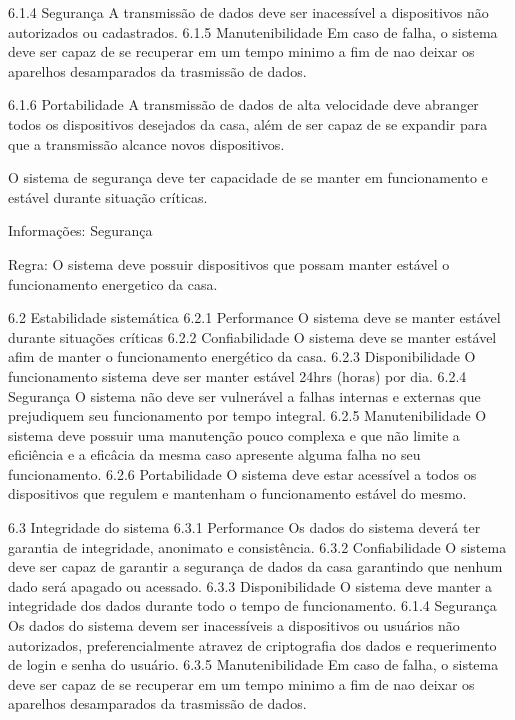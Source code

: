 6.1.4 Segurança
    A transmissão de dados deve ser inacessível a dispositivos não autorizados ou cadastrados.
6.1.5 Manutenibilidade
    Em caso de falha, o sistema deve ser capaz de se recuperar em um tempo minimo a fim de nao deixar os aparelhos desamparados da trasmissão de dados.

6.1.6 Portabilidade
    A transmissão de dados de alta velocidade deve abranger todos os dispositivos desejados da casa, além de ser capaz de se expandir para que a transmissão alcance novos dispositivos.






 O sistema de segurança deve ter capacidade de se manter em funcionamento e estável durante situação críticas.
    
    Informações: Segurança

    Regra: O sistema deve possuir dispositivos que possam manter estável o funcionamento energetico da casa.


6.2 Estabilidade sistemática
6.2.1 Performance 
O sistema deve se manter estável durante situações críticas
6.2.2 Confiabilidade
    O sistema deve se manter estável afim de manter o funcionamento energético da casa.
6.2.3 Disponibilidade
    O funcionamento sistema deve ser manter estável 24hrs (horas) por dia.
6.2.4 Segurança
    O sistema não deve ser vulnerável a falhas internas e externas que prejudiquem seu funcionamento por tempo integral.
6.2.5 Manutenibilidade
    O sistema deve possuir uma manutenção pouco complexa e que não limite a eficiência e a eficâcia da mesma caso apresente alguma falha no seu funcionamento.
6.2.6 Portabilidade
    O sistema deve estar acessível a todos os dispositivos que regulem e mantenham o funcionamento estável do mesmo.


6.3 Integridade do sistema
6.3.1 Performance 
   Os dados do sistema deverá ter garantia de integridade, anonimato e consistência. 
6.3.2 Confiabilidade
    O sistema deve ser capaz de garantir a segurança de dados da casa garantindo que nenhum dado será apagado ou acessado.
6.3.3 Disponibilidade
    O sistema deve manter a integridade dos dados durante todo o tempo de funcionamento.
6.1.4 Segurança
    Os dados do sistema devem ser inacessíveis a dispositivos ou usuários não autorizados, preferencialmente atravez de criptografia dos dados e requerimento de login e senha do usuário.
6.3.5 Manutenibilidade
    Em caso de falha, o sistema deve ser capaz de se recuperar em um tempo minimo a fim de nao deixar os aparelhos desamparados da trasmissão de dados.

